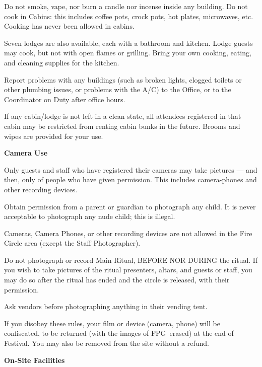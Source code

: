 \documentclass[9pt,twoside,openright,final,article]{memoir}
\def\fpg{{\beltanefamily FPG\ }}
\renewcommand{\subsection}[1]{%
  \vspace{6pt}%
  \needspace{1.25in}%
  \begin{center}\textbf{\Large \beltanefamily #1}\end{center}

  \nopagebreak}
\begin{document}
\begin{multicols}{2}
  Do not smoke, vape, nor burn a candle nor incense inside any
  building. Do not cook in Cabins: this includes coffee pots, crock
  pots, hot plates, microwaves,  etc. Cooking has never been allowed
  in cabins.

  Seven lodges are also available, each with a bathroom and
  kitchen. Lodge guests may cook, but not with open flames or
  grilling. Bring your own cooking, eating, and cleaning supplies for
  the kitchen.

  Report problems with any buildings (such as broken lights, clogged
  toilets or other plumbing issues, or problems with the A/C) to the
  Office, or to the Coordinator on Duty after office hours.

  If any cabin/lodge is not left in a clean state, all attendees
  registered in that cabin may be restricted from renting cabin bunks
  in the future. Brooms and wipes are provided for your use.

  \subsection{Camera Use}

  Only guests and staff who have registered their cameras may take
  pictures --- and then, only of people who have given permission. This
  includes camera-phones and other recording devices.

  Obtain permission from a parent or guardian to photograph any child. It
  is never acceptable to photograph any nude child; this is illegal.

  Cameras, Camera Phones, or other recording devices are not allowed in
  the Fire Circle area (except the Staff Photographer).

  Do not photograph or record Main Ritual, BEFORE NOR DURING the
  ritual. If you wish to take pictures of the ritual presenters, altars,
  and guests or staff, you may do so after the ritual has ended and the
  circle is released, with their permission.

  Ask vendors before photographing anything in their vending tent.

  If you disobey these rules, your film or device (camera, phone) will be
  confiscated, to be returned (with the images of \fpg erased) at the end
  of Festival. You may also be removed from the site without a refund.


  \subsection{On-Site Facilities}


\end{multicols}
\end{document}

